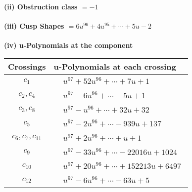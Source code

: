 \documentclass[1p]{elsarticle_modified}
\theoremstyle{definition}
\begin{document}
\flushleft \textbf{(ii) Obstruction class $= -1$}\\~\\
\flushleft \textbf{(iii) Cusp Shapes $= 6 u^{96}+4 u^{95}+\cdots+5 u-2$}\\~\\
\newpage\renewcommand{\arraystretch}{1}
\flushleft \textbf{(iv) u-Polynomials at the component}\newline \\
\begin{tabular}{m{50pt}|m{274pt}}
Crossings & \hspace{64pt}u-Polynomials at each crossing \\
\hline $$\begin{aligned}c_{1}\end{aligned}$$&$\begin{aligned}
&u^{97}+52 u^{96}+\cdots+7 u+1
\end{aligned}$\\
\hline $$\begin{aligned}c_{2},c_{4}\end{aligned}$$&$\begin{aligned}
&u^{97}-6 u^{96}+\cdots-5 u+1
\end{aligned}$\\
\hline $$\begin{aligned}c_{3},c_{8}\end{aligned}$$&$\begin{aligned}
&u^{97}- u^{96}+\cdots+32 u+32
\end{aligned}$\\
\hline $$\begin{aligned}c_{5}\end{aligned}$$&$\begin{aligned}
&u^{97}-2 u^{96}+\cdots-939 u+137
\end{aligned}$\\
\hline $$\begin{aligned}c_{6},c_{7},c_{11}\end{aligned}$$&$\begin{aligned}
&u^{97}+2 u^{96}+\cdots+u+1
\end{aligned}$\\
\hline $$\begin{aligned}c_{9}\end{aligned}$$&$\begin{aligned}
&u^{97}-33 u^{96}+\cdots-22016 u+1024
\end{aligned}$\\
\hline $$\begin{aligned}c_{10}\end{aligned}$$&$\begin{aligned}
&u^{97}+20 u^{96}+\cdots+152213 u+6497
\end{aligned}$\\
\hline $$\begin{aligned}c_{12}\end{aligned}$$&$\begin{aligned}
&u^{97}-6 u^{96}+\cdots-63 u+5
\end{aligned}$\\
\hline
\end{tabular}\\~\\
\end{document}
